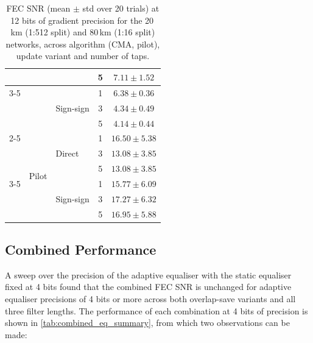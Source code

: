 \documentclass[12pt,a4paper]{article}
\begin{document}
\begin{table}[H]
\begin{tabular}{lllcc}
                                  &                        &                            & 5 & $7.11  \pm 1.52$ \\
                                  \cmidrule(l){3-5}
                                  &                        & \multirow{3}{*}{Sign-sign} & 1 & $6.38  \pm 0.36$ \\
                                  &                        &                            & 3 & $4.34  \pm 0.49$ \\
                                  &                        &                            & 5 & $4.14  \pm 0.44$ \\
                                  \cmidrule(l){2-5}
                                  & \multirow{6}{*}{Pilot} & \multirow{3}{*}{Direct}    & 1 & $16.50 \pm 5.38$ \\
                                  &                        &                            & 3 & $13.08 \pm 3.85$ \\
                                  &                        &                            & 5 & $13.08 \pm 3.85$ \\
                                  \cmidrule(l){3-5}
                                  &                        & \multirow{3}{*}{Sign-sign} & 1 & $15.77 \pm 6.09$ \\
                                  &                        &                            & 3 & $17.27 \pm 6.32$ \\
                                  &                        &                            & 5 & $16.95 \pm 5.88$ \\
        \bottomrule
    \end{tabular}
    \caption{FEC SNR (mean $\pm$ std over 20 trials) at 12 bits of gradient precision for the 20\,km (1:512 split) and 80\,km (1:16 split) networks, across algorithm (CMA, pilot), update variant and number of taps.}
    \label{tab:cma_fec_snr_fl12}
\end{table}
\subsection{Combined Performance}
A sweep over the precision of the adaptive equaliser with the static equaliser fixed at 4 bits found that the combined FEC SNR is unchanged for adaptive equaliser precisions of 4 bits or more across both overlap-save variants and all three filter lengths. The performance of each combination at 4 bits of precision is shown in \cref{tab:combined_eq_summary}, from which two observations can be made:
\end{document}
